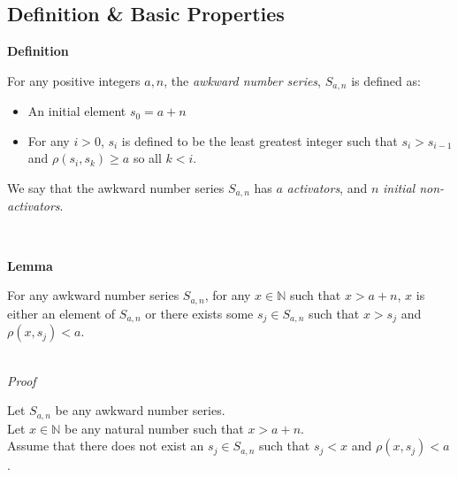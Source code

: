 \documentclass[a4paper,12pt]{article}
\begin{document}
\subsection{Definition \& Basic Properties}

\label{definition:awkward_number_series}
\hypertarget{definition:awkward_number_series}{}
\begin{tcolorbox}
\textbf{Definition}

\noindent For any positive integers $a, n$, the \textit{awkward number series}, $S_{a, n}$ is defined as:

\begin{itemize}
\item An initial element $s_0 = a + n$
\item For any $i > 0$, $s_i$ is defined to be the least greatest integer such that $s_i > s_{i - 1}$ and $\rho(s_i, s_k) \geq a$ so all $k < i$.
\end{itemize}


\noindent We say that the awkward number series $S_{a,n}$ has $a$ \textit{activators}, and $n$ \textit{initial non-activators}.

\end{tcolorbox}
\noindent \\









\label{lemma:exists_element_less_than_x}
\hypertarget{lemma:exists_element_less_than_x}{}
\begin{tcolorbox}
\textbf{Lemma}

For any awkward number series $S_{a, n}$, for any $x \in \mathbb{N}$ such that $x > a + n$, $x$ is either an element of $S_{a, n}$ or there exists some $s_j \in S_{a, n}$ such that $x > s_j$ and $\rho(x, s_j) < a$. 
\end{tcolorbox}

\noindent \\
\textit{Proof}

\noindent Let $S_{a, n}$ be any awkward number series.\\

\noindent Let $x \in \mathbb{N}$ be any natural number such that $x > a + n$.\\

\noindent Assume that there does not exist an $s_j \in S_{a, n}$ such that $s_j < x$ and $\rho(x, s_j) < a$.\\
\end{document}
